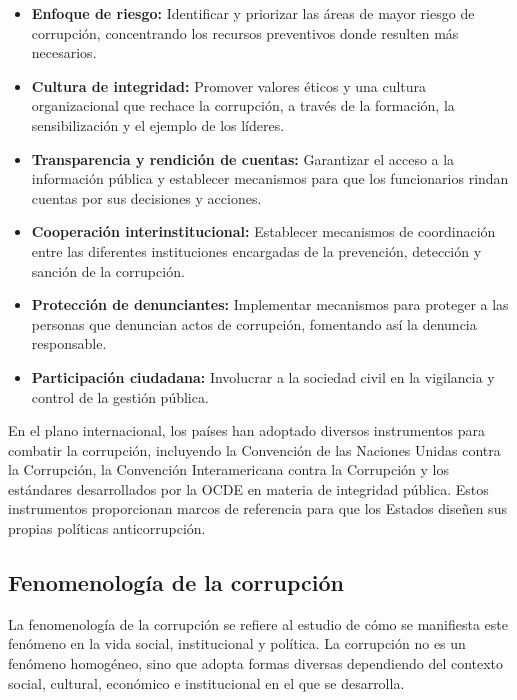 \documentclass[12pt,a4paper]{article}
\begin{document}
\begin{itemize}
    \item \textbf{Enfoque de riesgo:} Identificar y priorizar las áreas de mayor riesgo de corrupción, concentrando los recursos preventivos donde resulten más necesarios.
    
    \item \textbf{Cultura de integridad:} Promover valores éticos y una cultura organizacional que rechace la corrupción, a través de la formación, la sensibilización y el ejemplo de los líderes.
    
    \item \textbf{Transparencia y rendición de cuentas:} Garantizar el acceso a la información pública y establecer mecanismos para que los funcionarios rindan cuentas por sus decisiones y acciones.
    
    \item \textbf{Cooperación interinstitucional:} Establecer mecanismos de coordinación entre las diferentes instituciones encargadas de la prevención, detección y sanción de la corrupción.
    
    \item \textbf{Protección de denunciantes:} Implementar mecanismos para proteger a las personas que denuncian actos de corrupción, fomentando así la denuncia responsable.
    
    \item \textbf{Participación ciudadana:} Involucrar a la sociedad civil en la vigilancia y control de la gestión pública.
\end{itemize}

En el plano internacional, los países han adoptado diversos instrumentos para combatir la corrupción, incluyendo la Convención de las Naciones Unidas contra la Corrupción, la Convención Interamericana contra la Corrupción y los estándares desarrollados por la OCDE en materia de integridad pública. Estos instrumentos proporcionan marcos de referencia para que los Estados diseñen sus propias políticas anticorrupción.

\subsection{Fenomenología de la corrupción}

La fenomenología de la corrupción se refiere al estudio de cómo se manifiesta este fenómeno en la vida social, institucional y política. La corrupción no es un fenómeno homogéneo, sino que adopta formas diversas dependiendo del contexto social, cultural, económico e institucional en el que se desarrolla.
\end{document}
